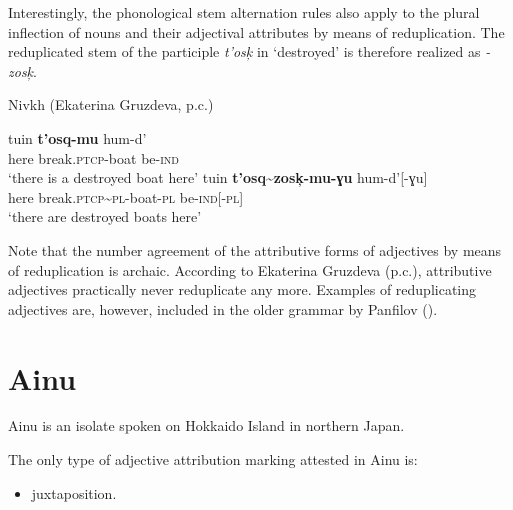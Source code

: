 Interestingly, the phonological stem alternation rules also apply to the plural inflection of nouns and their adjectival attributes by means of reduplication. The reduplicated stem of the participle \textit{t'osk̦} in  ‘destroyed’ is therefore realized as \textit{-zosk̦}.
\begin{exe}
\ex
\label{nivkh redup}
{\rm Nivkh (Ekaterina Gruzdeva, p.c.)}
\begin{xlist}
\ex 
\gll	tuin \textbf{t'osq-mu} hum-d'\\
	here break.\textsc{ptcp}-boat be-\textsc{ind}\\
\glt	‘there is a destroyed boat here’ 
\ex
\label{nivkh unaltered}
\gll	tuin \textbf{t'osq\textasciitilde zosk̦-mu-ɣu} hum-d'[-ɣu]\\
	here break.\textsc{ptcp}\textasciitilde \textsc{pl}-boat-\textsc{pl} be-\textsc{ind}[-\textsc{pl}]\\
\glt	‘there are destroyed boats here’
\end{xlist}
\end{exe}
Note that the number agreement of the attributive forms of adjectives by means of reduplication is archaic. According to Ekaterina Gruzdeva (p.c.), attributive adjectives practically never reduplicate any more. Examples of reduplicating adjectives are, however, included in the older grammar by Panfilov (\citeyear{panfilov1965}).

\section{Ainu}
Ainu is an isolate spoken on Hokkaido Island in northern Japan.

The only type of adjective attribution marking attested in Ainu is:
\begin{itemize}
\item juxtaposition.
\end{itemize}

